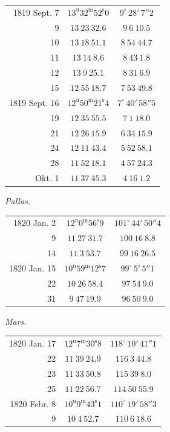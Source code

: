 \begin{center}
\begin{tabular}{r|c|c}
1819 Sept. 7 & $13^{\mathrm u}32^{\mathrm m}52^{\mathrm s}0$ & $9^\circ\,28'\,7''2$ \\
9 & $13\ 23\ 32.6$ & $9\ 6\ 10.5$ \\
10 & $13\ 18\ 51.1$ & $8\ 54\ 44.7$ \\
11 & $13\ 14\ 8.6$ & $8\ 43\ 1.8$ \\
12 & $13\ 9\ 25.1$ & $8\ 31\ 6.9$ \\
15 & $12\ 55\ 18.7$ & $7\ 53\ 49.8$ \\
\hline
1819 Sept. 16 & $12^{\mathrm u}50^{\mathrm m}21^{\mathrm s}4$ & $7^\circ\,40'\,58''5$ \\
19 & $12\ 35\ 55.5$ & $7\ 1\ 18.0$ \\
21 & $12\ 26\ 15.9$ & $6\ 34\ 15.9$ \\
24 & $12\ 11\ 43.4$ & $5\ 52\ 58.1$ \\
28 & $11\ 52\ 18.1$ & $4\ 57\ 24.3$ \\
Okt. 1 & $11\ 37\ 45.3$ & $4\ 16\ 1.2$ \\
\end{tabular}
\end{center}

\begin{center}
\textit{Pallas.}
\end{center}

\begin{center}
\begin{tabular}{r|c|c}
1820 Jan. 2 & $12^{\mathrm u}0^{\mathrm m}56^{\mathrm s}9$ & $101^\circ\,44'\,50''4$ \\
9 & $11\ 27\ 31.7$ & $100\ 16\ 8.8$ \\
14 & $11\ 3\ 53.7$ & $99\ 16\ 26.5$ \\
\hline
1820 Jan. 15 & $10^{\mathrm u}59^{\mathrm m}12^{\mathrm s}7$ & $99^\circ\,5'\,5''1$ \\
22 & $10\ 26\ 58.4$ & $97\ 54\ 9.0$ \\
31 & $9\ 47\ 19.9$ & $96\ 50\ 9.0$ \\
\end{tabular}
\end{center}

\begin{center}
\textit{Mars.}
\end{center}

\begin{center}
\begin{tabular}{r|c|c}
1820 Jan. 17 & $12^{\mathrm u}7^{\mathrm m}30^{\mathrm s}8$ & $118^\circ\,10'\,41''1$ \\
22 & $11\ 39\ 24.9$ & $116\ 3\ 44.8$ \\
23 & $11\ 33\ 50.8$ & $115\ 39\ 8.0$ \\
25 & $11\ 22\ 56.7$ & $114\ 50\ 55.9$ \\
\hline
1820 Febr. 8 & $10^{\mathrm u}9^{\mathrm m}43^{\mathrm s}1$ & $110^\circ\,19'\,58''3$ \\
9 & $10\ 4\ 52.7$ & $110\ 6\ 18.6$ \\
\end{tabular}
\end{center}

